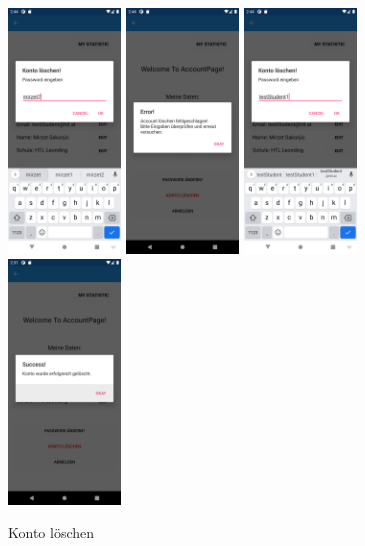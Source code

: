 \begin{figure}[h]
    \begin{center}
        \includegraphics[width=3cm]{pics/Xamarin Student/23 Delete Acc Error.png}\hfill
        \includegraphics[width=3cm]{pics/Xamarin Student/24 Delete Acc Error.png}\hfill
        \includegraphics[width=3cm]{pics/Xamarin Student/25 Acc delete pass.png}\hfill
        \includegraphics[width=3cm]{pics/Xamarin Student/23 Delete Acc.png}
        \caption[MyAccount]{Konto löschen}
        \end{center}
\end{figure}

